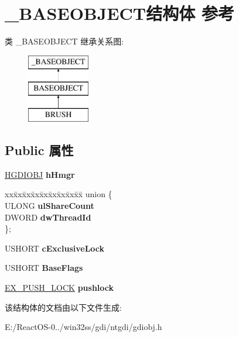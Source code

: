 \hypertarget{struct___b_a_s_e_o_b_j_e_c_t}{}\section{\+\_\+\+B\+A\+S\+E\+O\+B\+J\+E\+C\+T结构体 参考}
\label{struct___b_a_s_e_o_b_j_e_c_t}
类 \+\_\+\+B\+A\+S\+E\+O\+B\+J\+E\+CT 继承关系图\+:\begin{figure}[H]
\begin{center}
\leavevmode
\includegraphics[height=3.000000cm]{struct___b_a_s_e_o_b_j_e_c_t}
\end{center}
\end{figure}
\subsection*{Public 属性}
\begin{DoxyCompactItemize}
\item 
\mbox{\label{struct___b_a_s_e_o_b_j_e_c_t_a3e97211307bf828277e75a300e2a3faf}} 
\hyperlink{interfacevoid}{H\+G\+D\+I\+O\+BJ} {\bfseries h\+Hmgr}
\item 
\mbox{\label{struct___b_a_s_e_o_b_j_e_c_t_a8e27388f86af3ba90fb54be04b7ff72a}} 
\begin{tabbing}
xx\=xx\=xx\=xx\=xx\=xx\=xx\=xx\=xx\=\kill
union \{\\
\>ULONG {\bfseries ulShareCount}\\
\>DWORD {\bfseries dwThreadId}\\
\}; \\

\end{tabbing}\item 
\mbox{\label{struct___b_a_s_e_o_b_j_e_c_t_a63c32ce06b16fcf87eba06353cb982b3}} 
U\+S\+H\+O\+RT {\bfseries c\+Exclusive\+Lock}
\item 
\mbox{\label{struct___b_a_s_e_o_b_j_e_c_t_a5efc93fc196fc6ffdcbe49d61188da13}} 
U\+S\+H\+O\+RT {\bfseries Base\+Flags}
\item 
\mbox{\label{struct___b_a_s_e_o_b_j_e_c_t_ac15ffa88876a2d427553b1cf23472378}} 
\hyperlink{struct___e_x___p_u_s_h___l_o_c_k}{E\+X\+\_\+\+P\+U\+S\+H\+\_\+\+L\+O\+CK} {\bfseries pushlock}
\end{DoxyCompactItemize}


该结构体的文档由以下文件生成\+:\begin{DoxyCompactItemize}
\item 
E\+:/\+React\+O\+S-\/0../win32ss/gdi/ntgdi/gdiobj.\+h\end{DoxyCompactItemize}
